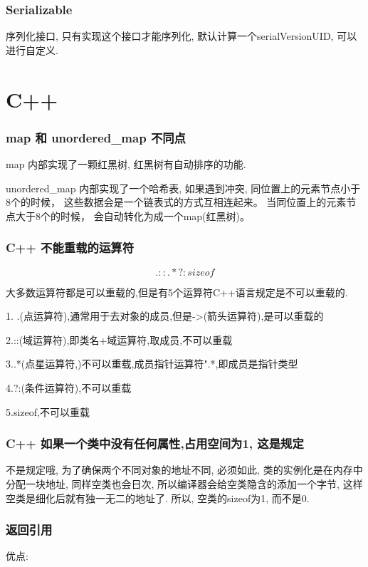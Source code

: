 \documentclass[UTF8]{ctexart}
\begin{document}
\subsubsection{Serializable}
序列化接口, 只有实现这个接口才能序列化, 默认计算一个serialVersionUID, 可以进行自定义.
\section{C++}

\subsubsection{map 和 unordered\_map 不同点}

map 内部实现了一颗红黑树, 红黑树有自动排序的功能.

unordered\_map 内部实现了一个哈希表, 如果遇到冲突, 同位置上的元素节点小于8个的时候， 这些数据会是一个链表式的方式互相连起来。 当同位置上的元素节点大于8个的时候， 会自动转化为成一个map(红黑树)。

\subsubsection{C++ 不能重载的运算符}
$$. :: .* ?: sizeof$$

大多数运算符都是可以重载的,但是有5个运算符C++语言规定是不可以重载的.

1. .(点运算符),通常用于去对象的成员,但是->(箭头运算符),是可以重载的

2.::(域运算符),即类名+域运算符,取成员,不可以重载

3..*(点星运算符,)不可以重载,成员指针运算符".*,即成员是指针类型

4.?:(条件运算符),不可以重载

5.sizeof,不可以重载
\subsubsection{C++ 如果一个类中没有任何属性,占用空间为1, 这是规定}

不是规定哦, 为了确保两个不同对象的地址不同, 必须如此, 类的实例化是在内存中分配一块地址, 同样空类也会日次, 所以编译器会给空类隐含的添加一个字节, 这样空类是细化后就有独一无二的地址了. 所以, 空类的sizeof为1, 而不是0.

\subsubsection{返回引用}

优点:
\end{document}
